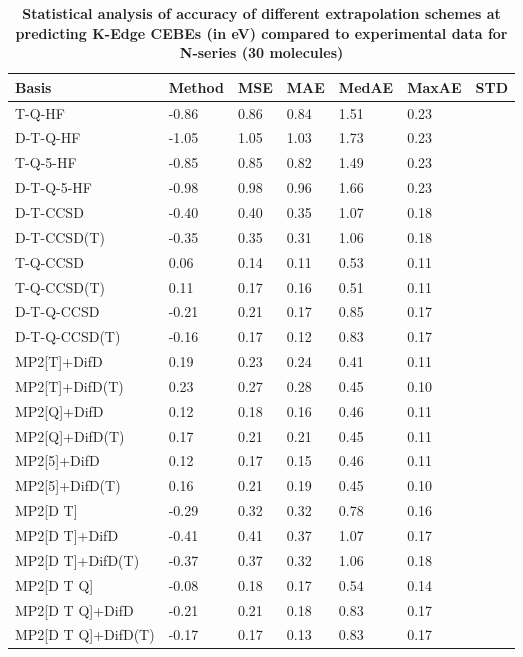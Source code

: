 \begin{table}
  \caption{\textbf{Statistical analysis of accuracy of different extrapolation schemes at predicting K-Edge CEBEs (in eV) compared to experimental data for N-series (30 molecules)}}
  \label{tbl:extrap-scheme-summary-n}
  \begin{tabular}{l l l l l l l }
    \hline
    \textbf{Basis} & \textbf{Method} & \textbf{MSE} & \textbf{MAE} & \textbf{MedAE} & \textbf{MaxAE} & \textbf{STD} \\ 
    \hline
    T-Q-HF & -0.86 & 0.86 & 0.84 & 1.51 & 0.23 \\ 
    D-T-Q-HF & -1.05 & 1.05 & 1.03 & 1.73 & 0.23 \\ 
    T-Q-5-HF & -0.85 & 0.85 & 0.82 & 1.49 & 0.23 \\ 
    D-T-Q-5-HF & -0.98 & 0.98 & 0.96 & 1.66 & 0.23 \\ 
    D-T-CCSD & -0.40 & 0.40 & 0.35 & 1.07 & 0.18 \\ 
    D-T-CCSD(T) & -0.35 & 0.35 & 0.31 & 1.06 & 0.18 \\ 
    T-Q-CCSD & 0.06 & 0.14 & 0.11 & 0.53 & 0.11 \\ 
    T-Q-CCSD(T) & 0.11 & 0.17 & 0.16 & 0.51 & 0.11 \\ 
    D-T-Q-CCSD & -0.21 & 0.21 & 0.17 & 0.85 & 0.17 \\ 
    D-T-Q-CCSD(T) & -0.16 & 0.17 & 0.12 & 0.83 & 0.17 \\ 
    MP2[T]+DifD & 0.19 & 0.23 & 0.24 & 0.41 & 0.11 \\ 
    MP2[T]+DifD(T) & 0.23 & 0.27 & 0.28 & 0.45 & 0.10 \\ 
    MP2[Q]+DifD & 0.12 & 0.18 & 0.16 & 0.46 & 0.11 \\ 
    MP2[Q]+DifD(T) & 0.17 & 0.21 & 0.21 & 0.45 & 0.11 \\ 
    MP2[5]+DifD & 0.12 & 0.17 & 0.15 & 0.46 & 0.11 \\ 
    MP2[5]+DifD(T) & 0.16 & 0.21 & 0.19 & 0.45 & 0.10 \\ 
    MP2[D T] & -0.29 & 0.32 & 0.32 & 0.78 & 0.16 \\ 
    MP2[D T]+DifD & -0.41 & 0.41 & 0.37 & 1.07 & 0.17 \\ 
    MP2[D T]+DifD(T) & -0.37 & 0.37 & 0.32 & 1.06 & 0.18 \\ 
    MP2[D T Q] & -0.08 & 0.18 & 0.17 & 0.54 & 0.14 \\ 
    MP2[D T Q]+DifD & -0.21 & 0.21 & 0.18 & 0.83 & 0.17 \\ 
    MP2[D T Q]+DifD(T) & -0.17 & 0.17 & 0.13 & 0.83 & 0.17 \\ 

\end{tabular}
\end{table}
